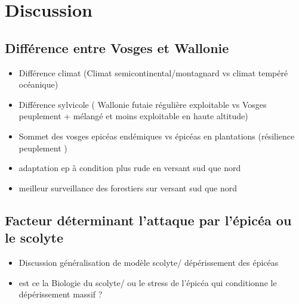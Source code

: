 \documentclass[3p,times]{elsarticle}
\begin{document}
	





\section{Discussion}

\subsection{Différence entre Vosges et Wallonie}
\begin{itemize}
	\item Différence climat (Climat semicontinental/montagnard vs climat tempéré océanique)
	\item Différence sylvicole ( Wallonie futaie régulière exploitable vs Vosges peuplement + mélangé et moins exploitable en haute altitude)
	\item Sommet des vosges epicéas endémiques vs épicéas en plantations (résilience peuplement )
	\item adaptation ep à condition plus rude en versant sud que nord 
	\item meilleur surveillance des forestiers sur versant sud que nord 
	
\end{itemize}

\subsection{Facteur déterminant l'attaque par l'épicéa ou le scolyte}

\begin{itemize}
	\item Discussion généralisation de modèle scolyte/ dépérissement des épicéas
	\item est ce la Biologie du scolyte/ ou le stress de l'épicéa qui conditionne le dépérissement massif ?
	
\end{itemize}
\end{document}
